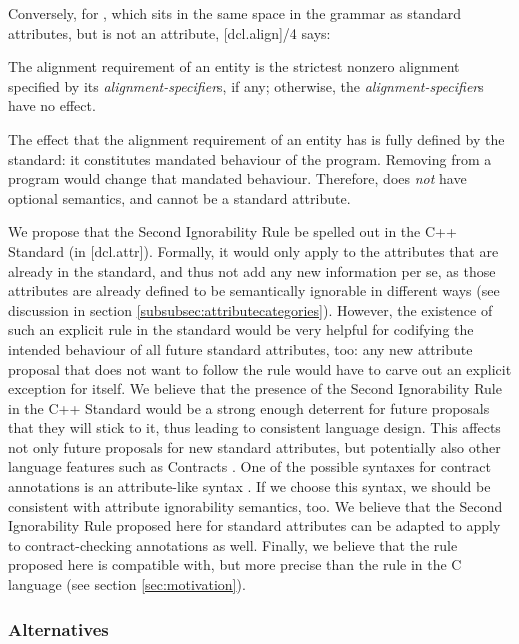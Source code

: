 Conversely, for , which sits in the same space in the grammar as standard attributes, but is not an attribute, [dcl.align]/4 says:
\begin{adjustwidth}{0.5cm}{0.5cm}
The alignment requirement of an entity is the strictest nonzero alignment specified by its \emph{alignment-specifier}s, if any; otherwise, the \emph{alignment-specifier}s have no effect.
\end{adjustwidth}
The effect that the alignment requirement of an entity has is fully defined by the standard: it constitutes mandated behaviour of the program. Removing  from a program would change that mandated behaviour. Therefore,  does \emph{not} have optional semantics, and cannot be a standard attribute.

We propose that the Second Ignorability Rule be spelled out in the C++ Standard (in [dcl.attr]). Formally, it would only apply to the attributes that are already in the standard, and thus not add any new information per se, as those attributes are already defined to be semantically ignorable in different ways (see discussion in section \ref{subsubsec:attributecategories}). However, the existence of such an explicit rule in the standard would be very helpful for codifying the intended behaviour of all future standard attributes, too: any new attribute proposal that does not want to follow the rule would have to carve out an explicit exception for itself. We believe that the presence of the Second Ignorability Rule in the C++ Standard would be a strong enough deterrent for future proposals that they will stick to it, thus leading to consistent language design. This affects not only future proposals for new standard attributes, but potentially also other language features such as Contracts \cite{P2521R2}. One of the possible syntaxes for contract annotations is an attribute-like syntax \cite{P2487R0}. If we choose this syntax, we should be consistent with attribute ignorability semantics, too. We believe that the Second Ignorability Rule proposed here for standard attributes can be adapted to apply to contract-checking annotations as well. Finally, we believe that the rule proposed here is compatible with, but more precise than the rule in the C language (see section \ref{sec:motivation}).

\subsubsection{Alternatives}


